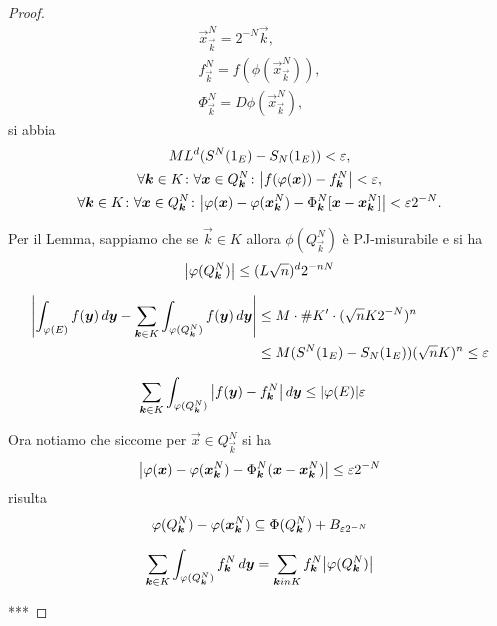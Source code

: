\begin{proof}
\begin{gather*}
  \vec x^N_{\vec k} = 2^{-N}\vec k,\\
  f^N_{\vec k} = f(\phi(\vec x^N_{\vec k})),\\ 
  \Phi^N_{\vec k} = D\phi(\vec x^N_{\vec k}), 
\end{gather*}
si abbia
\begin{gather*}
  M L^d (S^N(1_E)-S_N(1_E)) < \varepsilon,\\
  \forall \boldsymbol k\in K \colon \forall \boldsymbol x \in Q^N_{\boldsymbol k}\colon
    {\left|f(\varphi(\boldsymbol x))-f^N_{\boldsymbol k}\right|} < \varepsilon,\\
  \forall \boldsymbol k\in K \colon \forall \boldsymbol x \in Q^N_{\boldsymbol k}\colon
    {\left|\varphi(\boldsymbol x) - \varphi(\boldsymbol x^N_{\boldsymbol k})-\Phi^N_{\boldsymbol k}[\boldsymbol x-\boldsymbol x^N_{\boldsymbol k}]\right|} < \varepsilon 2^{-N}.
\end{gather*}

Per il Lemma, sappiamo che se $\vec k \in K$ allora $\phi(Q^N_{\vec k})$ è PJ-misurabile 
e si ha 
\[
 {\left|\varphi(Q^N_{\boldsymbol k})\right|} 
 \le (L\sqrt n)^d 2^{-nN}
\]

\begin{align*}
  {\left|\int_{\varphi(E)} f(\boldsymbol y)\, d\boldsymbol y 
  - \sum_{\boldsymbol k \in K} \int_{\varphi(Q^N_{\boldsymbol k})} f(\boldsymbol y)\, d\boldsymbol y\right|}
  &\le M \cdot \#K' \cdot (\sqrt n K 2^{-N})^n \\
  &\le M (S^N(1_E)-S_N(1_E)) (\sqrt n K)^n
  \le \varepsilon 
\end{align*}

\begin{align*}
\sum_{\boldsymbol k \in K}\int_{\varphi(Q^N_{\boldsymbol k})} {\left|f(\boldsymbol y) - f^N_{\boldsymbol k}\right|}\, d\boldsymbol y
&\le  {\left|\varphi(E)\right|} \varepsilon 
\end{align*}

Ora notiamo che siccome per $\vec x \in Q^N_{\vec k}$ si ha 
\[
  {\left|
    \varphi(\boldsymbol x) - \varphi(\boldsymbol x^N_{\boldsymbol k}) 
    - \Phi^N_{\boldsymbol k}(\boldsymbol x - \boldsymbol x^N_{\boldsymbol k})\right|} \le \varepsilon 2^{-N}
\]
risulta 
\begin{align*}
 \varphi(Q^N_{\boldsymbol k}) - \varphi(\boldsymbol x^N_{\boldsymbol k}) \subseteq \Phi(Q^N_{\boldsymbol k})+B_{\varepsilon 2^{-N}}
\end{align*}

\begin{align*}
\sum_{\boldsymbol k \in K}
  \int_{\varphi(Q^N_{\boldsymbol k})} f^N_{\boldsymbol k}\, d\boldsymbol y 
= \sum_{\boldsymbol k in K} f^N_{\boldsymbol k} {\left|\varphi(Q^N_{\boldsymbol k})\right|}
\end{align*}

***


\end{proof}
